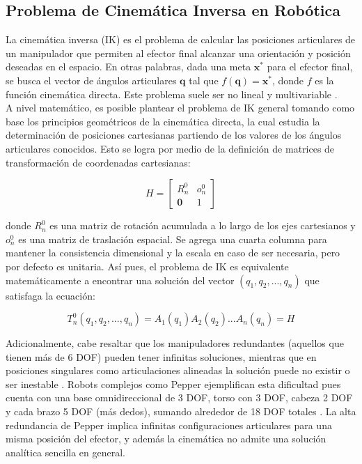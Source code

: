 \subsection{Problema de Cinemática Inversa en Robótica}

La cinemática inversa (IK) es el problema de calcular las posiciones articulares de un manipulador que permiten al efector final alcanzar una orientación y posición deseadas en el espacio. En otras palabras, dada una meta $\mathbf{x}^*$ para el efector final, se busca el vector de ángulos articulares $\mathbf{q}$ tal que $f(\mathbf{q})=\mathbf{x}^*$, donde $f$ es la función cinemática directa. Este problema suele ser no lineal y multivariable \parencite{elhussieny2017inverse}. \\

A nivel matemático, es posible plantear el problema de IK general tomando como base los principios geométricos de la cinemática directa, la cual estudia la determinación de posiciones cartesianas partiendo de los valores de los ángulos articulares conocidos. Esto se logra por medio de la definición de matrices de transformación de coordenadas cartesianas:

$$H = \begin{bmatrix}
	R_n^0 & o_n^0 \\
	\mathbf{0} & 1
	\end{bmatrix}
$$

donde $R_n^0$ es una matriz de rotación acumulada a lo largo de los ejes cartesianos y $o_n^0$ es una matriz de traslación espacial. Se agrega una cuarta columna para mantener la consistencia dimensional y la escala en caso de ser necesaria, pero por defecto es unitaria. Así pues, el problema de IK es equivalente matemáticamente a encontrar una solución del vector $(q_1, q_2, ..., q_n)$ que satisfaga la ecuación:

\begin{equation}
	T_n^0(q_1, q_2, ..., q_n) = A_1(q_1) A_2(q_2) ... A_n(q_n) = H
\end{equation}

Adicionalmente, cabe resaltar que los manipuladores redundantes (aquellos que tienen más de 6 DOF) pueden tener infinitas soluciones, mientras que en posiciones singulares como articulaciones alineadas la solución puede no existir o ser inestable \parencite{elhussieny2017inverse}. Robots complejos como Pepper ejemplifican esta dificultad pues cuenta con una base omnidireccional de 3 DOF, torso con 3 DOF, cabeza 2 DOF y cada brazo 5 DOF (más dedos), sumando alrededor de 18 DOF totales \parencite{softbank2023pepper}. La alta redundancia de Pepper implica infinitas configuraciones articulares para una misma posición del efector, y además la cinemática no admite una solución analítica sencilla en general.\\

